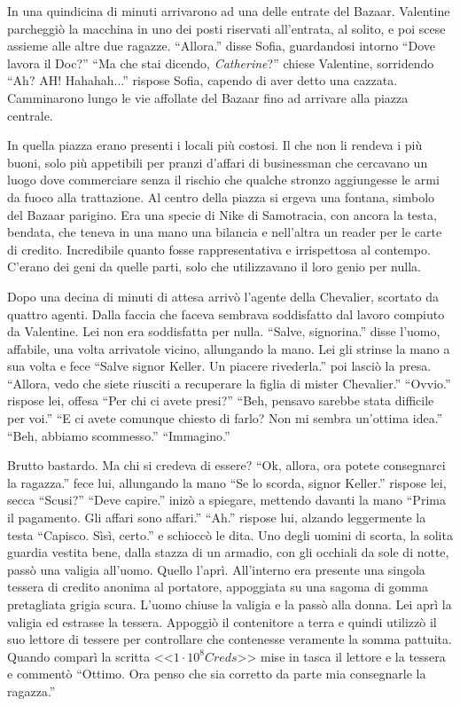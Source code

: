     In una quindicina di minuti arrivarono ad una delle entrate del Bazaar. Valentine parcheggiò la macchina in uno dei
    posti riservati all'entrata, al solito, e poi scese assieme alle altre due ragazze. ``Allora.'' disse Sofia,
    guardandosi intorno ``Dove lavora il Doc?'' ``Ma che stai dicendo, \emph{Catherine}?'' chiese Valentine, sorridendo
    ``Ah? AH! Hahahah...'' rispose Sofia, capendo di aver detto una cazzata. Camminarono lungo le vie affollate del
    Bazaar fino ad arrivare alla piazza centrale.

    In quella piazza erano presenti i locali più costosi. Il che non li rendeva i più buoni, solo più appetibili per
    pranzi d'affari di businessman che cercavano un luogo dove commerciare senza il rischio che qualche stronzo
    aggiungesse le armi da fuoco alla trattazione. Al centro della piazza si ergeva una fontana, simbolo del Bazaar
    parigino. Era una specie di Nike di Samotracia, con ancora la testa, bendata, che teneva in una mano una bilancia e
    nell'altra un reader per le carte di credito. Incredibile quanto fosse rappresentativa e irrispettosa al contempo.
    C'erano dei geni da quelle parti, solo che utilizzavano il loro genio per nulla.

    Dopo una decina di minuti di attesa arrivò l'agente della Chevalier, scortato da quattro agenti. Dalla faccia che
    faceva sembrava soddisfatto dal lavoro compiuto da Valentine. Lei non era soddisfatta per nulla. ``Salve,
    signorina.'' disse l'uomo, affabile, una volta arrivatole vicino, allungando la mano. Lei gli strinse la mano a sua
    volta e fece ``Salve signor Keller. Un piacere rivederla.'' poi lasciò la presa. ``Allora, vedo che siete riusciti a
    recuperare la figlia di mister Chevalier.'' ``Ovvio.'' rispose lei, offesa ``Per chi ci avete presi?'' ``Beh,
    pensavo sarebbe stata difficile per voi.'' ``E ci avete comunque chiesto di farlo? Non mi sembra un'ottima idea.''
    ``Beh, abbiamo scommesso.'' ``Immagino.''

    Brutto bastardo. Ma chi si credeva di essere? ``Ok, allora, ora potete consegnarci la ragazza.'' fece lui,
    allungando la mano ``Se lo scorda, signor Keller.'' rispose lei, secca ``Scusi?'' ``Deve capire.'' inizò a
    spiegare, mettendo davanti la mano ``Prima il pagamento. Gli affari sono affari.'' ``Ah.'' rispose lui, alzando
    leggermente la testa ``Capisco. Sìsì, certo.'' e schioccò le dita. Uno degli uomini di scorta, la solita guardia
    vestita bene, dalla stazza di un armadio, con gli occhiali da sole di notte, passò una valigia all'uomo. Quello
    l'aprì. All'interno era presente una singola tessera di credito anonima al portatore, appoggiata su una sagoma di
    gomma pretagliata grigia scura. L'uomo chiuse la valigia e la passò alla donna. Lei aprì la valigia ed estrasse la
    tessera. Appoggiò il contenitore a terra e quindi utilizzò il suo lettore di tessere per controllare che contenesse
    veramente la somma pattuita. Quando comparì la scritta <<$1 \cdot{} 10^8 Creds$>> mise in tasca il lettore e la
    tessera e commentò ``Ottimo. Ora penso che sia corretto da parte mia consegnarle la ragazza.''
